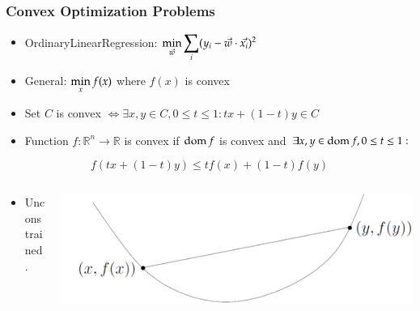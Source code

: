 \subsection{}
\begin{frame}
\frametitle{Convex Optimization Problems}


\begin{itemize}
\item OrdinaryLinearRegression: $\displaystyle \min_{\vec{w}}\sum_i(y_i -
  \vec{w} \cdot \vec{x_i})^2$
\item General: $\displaystyle \min_xf(x)$ where $f(x)$ is convex
\item Set $C$ is convex $\Longleftrightarrow \exists x, y\in C, 0\le t
  \le 1: tx +(1 - t)y \in C$
\item Function $f : \mathbb{R}^n \rightarrow \mathbb{R}$ is convex if
  $\operatorname{dom} f$ is convex and $\exists x, y \in \operatorname{dom} f, 0\le t \le 1:$

\end{itemize}

\vspace{-4mm}

{\small
$$f(tx + (1 - t)y) \le tf(x) + (1 - t)f(y)$$
}

\vspace{-4mm}

\begin{columns}
  \begin{column}{0.5\textwidth}

\begin{itemize}
\item Unconstrained.
\end{itemize}

  \end{column}

  \begin{column}{0.5\textwidth}
\includegraphics[scale=0.2]{pics/uncons.png}
  \end{column}
\end{columns}

\end{frame}

